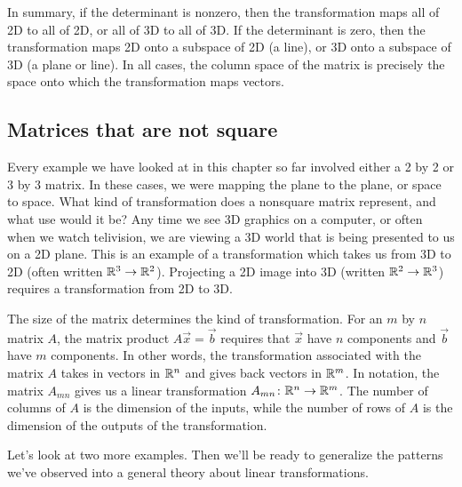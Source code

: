 In summary, if the determinant is nonzero, then the transformation maps all of 2D to all of 2D, or all of 3D to all of 3D.  If the determinant is zero, then the transformation maps 2D onto a subspace of 2D (a line), or 3D onto a subspace of 3D (a plane or line).  In all cases, the column space of the matrix is precisely the space onto which the transformation maps vectors.

\subsection{Matrices that are not square}

Every example we have looked at in this chapter so far involved either a 2 by 2 or 3 by 3 matrix.  In these cases, we were mapping the plane to the plane, or space to space.  What kind of transformation does a nonsquare matrix represent, and what use would it be?  Any time we see 3D graphics on a computer, or often when we watch telivision, we are viewing a 3D world that is being presented to us on a 2D plane.  This is an example of a transformation which takes us from 3D to 2D (often written $\mathbb{R}^3\to \mathbb{R}^2$).  Projecting a 2D image into 3D (written $\mathbb{R}^2\to \mathbb{R}^3$) requires a transformation from 2D to 3D.

The size of the matrix determines the kind of transformation.  For an $m$ by $n$ matrix $A$, the matrix product $A\vec x = \vec b$ requires that $\vec x$ have $n$ components and $\vec b$ have $m$ components.  In other words, the transformation associated with the matrix $A$ takes in vectors in $\mathbb{R}^n$ and gives back vectors in $\mathbb{R}^m$.  In notation, the matrix $A_{mn}$ gives us a linear transformation $A_{mn}\colon \mathbb{R}^n\to \mathbb{R}^m$.  The number of columns of $A$ is the dimension of the inputs, while the number of rows of $A$ is the dimension of the outputs of the transformation.

Let's look at two more examples.  Then we'll be ready to generalize the patterns we've observed into a general theory about linear transformations.

